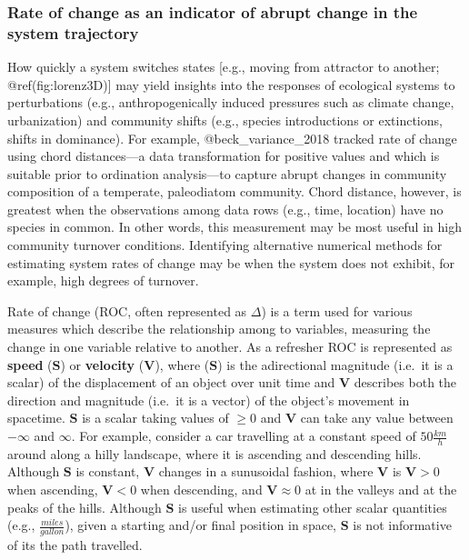 \documentclass[]{article}
\begin{document}
\hypertarget{rate-of-change-as-an-indicator-of-abrupt-change-in-the-system-trajectory}{%
\subsubsection{Rate of change as an indicator of abrupt change in the
system
trajectory}\label{rate-of-change-as-an-indicator-of-abrupt-change-in-the-system-trajectory}}

How quickly a system switches states {[}e.g., moving from attractor to
another; @ref(fig:lorenz3D){]} may yield insights into the responses of
ecological systems to perturbations (e.g., anthropogenically induced
pressures such as climate change, urbanization) and community shifts
(e.g., species introductions or extinctions, shifts in dominance). For
example, @beck\_variance\_2018 tracked rate of change using chord
distances---a data transformation for positive values and which is
suitable prior to ordination analysis---to capture abrupt changes in
community composition of a temperate, paleodiatom community. Chord
distance, however, is greatest when the observations among data rows
(e.g., time, location) have no species in common. In other words, this
measurement may be most useful in high community turnover conditions.
Identifying alternative numerical methods for estimating system rates of
change may be when the system does not exhibit, for example, high
degrees of turnover.

Rate of change (ROC, often represented as \(\Delta\)) is a term used for
various measures which describe the relationship among to variables,
measuring the change in one variable relative to another. As a refresher
ROC is represented as \textbf{speed} (\(\textbf{S}\)) or
\textbf{velocity} (\(\textbf{V}\)), where (\(\textbf{S}\)) is the
adirectional magnitude (i.e.~it is a scalar) of the displacement of an
object over unit time and \(\textbf{V}\) describes both the direction
and magnitude (i.e.~it is a vector) of the object's movement in
spacetime. \(\textbf{S}\) is a scalar taking values of \(\geq0\) and
\(\textbf{V}\) can take any value between \(-\infty\) and \(\infty\).
For example, consider a car travelling at a constant speed of
\(50\frac{km}{h}\) around along a hilly landscape, where it is ascending
and descending hills. Although \(\textbf{S}\) is constant,
\(\textbf{V}\) changes in a sunusoidal fashion, where \(\textbf{V}\) is
\(\textbf{V}>0\) when ascending, \(\textbf{V}<0\) when descending, and
\(\textbf{V}\approx0\) at in the valleys and at the peaks of the hills.
Although \(\textbf{S}\) is useful when estimating other scalar
quantities (e.g., \(\frac{miles}{gallon}\)), given a starting and/or
final position in space, \(\textbf{S}\) is not informative of its the
path travelled.
\end{document}
